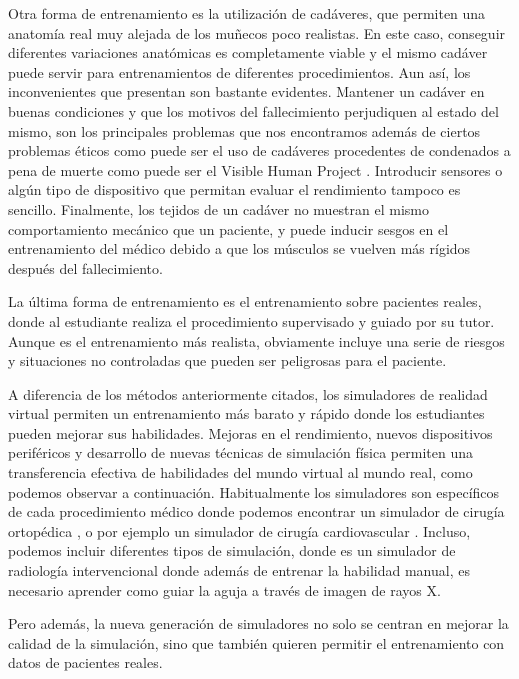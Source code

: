 Otra forma de entrenamiento es la utilización de cadáveres\cite{Tsui2007}, que permiten una anatomía real muy alejada de los muñecos poco realistas. En este caso, conseguir diferentes variaciones anatómicas es completamente viable y el mismo cadáver puede servir para entrenamientos de diferentes procedimientos. Aun así, los inconvenientes que presentan son bastante evidentes. Mantener un cadáver en buenas condiciones y que los motivos del fallecimiento perjudiquen al estado del mismo, son los principales problemas que nos encontramos además de ciertos problemas éticos como puede ser el uso de cadáveres procedentes de condenados a pena de muerte como puede ser el Visible Human Project \cite{ackerman1998visible}. Introducir sensores o algún tipo de dispositivo que permitan evaluar el rendimiento tampoco es sencillo. Finalmente, los tejidos de un cadáver no muestran el mismo comportamiento mecánico que un paciente, y puede inducir sesgos en el entrenamiento del médico debido a que los músculos se vuelven más rígidos después del fallecimiento.


La última forma de entrenamiento es el entrenamiento sobre pacientes reales, donde al estudiante realiza el procedimiento supervisado y guiado por su tutor. Aunque es el entrenamiento más realista, obviamente incluye una serie de riesgos y situaciones no controladas que pueden ser peligrosas para el paciente.


A diferencia de los métodos anteriormente citados, los simuladores de realidad virtual permiten un entrenamiento más barato y rápido donde los estudiantes pueden mejorar sus habilidades. Mejoras en el rendimiento, nuevos dispositivos periféricos y desarrollo de nuevas técnicas de simulación física permiten una transferencia efectiva de habilidades del mundo virtual al mundo real, como podemos observar a continuación.
Habitualmente los simuladores  son específicos de cada procedimiento médico donde podemos encontrar un simulador de cirugía ortopédica \cite{cecil2017advanced}, o por ejemplo un simulador de cirugía cardiovascular \cite{korzeniowski2018vcsim3}. Incluso, podemos incluir diferentes tipos de simulación, donde \cite{villard2014interventional} es un simulador de radiología intervencional donde además de entrenar la habilidad manual, es necesario aprender como guiar la aguja a través de imagen de rayos X.

Pero además, la nueva generación de simuladores no solo se centran en mejorar la calidad de la simulación, sino que también quieren permitir el entrenamiento con datos de pacientes reales\cite{Willaert2012,  Votta2013}. 






